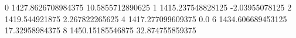 0 1427.8626708984375 10.5855712890625
1 1415.237548828125 -2.03955078125
2 1419.544921875 2.267822265625
4 1417.277099609375 0.0
6 1434.606689453125 17.32958984375
8 1450.15185546875 32.874755859375

